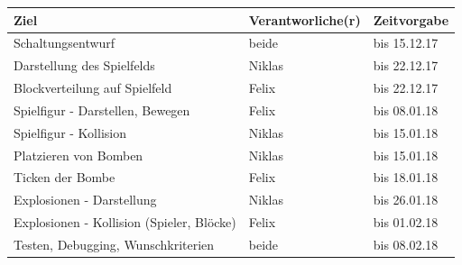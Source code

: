 \documentclass[parskip=full]{scrartcl}
\begin{document}
		\begin{table}[H]
			\centering
			\label{my-label}
			\begin{tabular}{l|l|l}
				Ziel                                      & Verantworliche(r) & Zeitvorgabe  \\
				\hline
				Schaltungsentwurf                         & beide           & bis 15.12.17 \\
				Darstellung des Spielfelds                & Niklas          & bis 22.12.17 \\
				Blockverteilung auf Spielfeld             & Felix           & bis 22.12.17 \\
				Spielfigur - Darstellen, Bewegen          & Felix           & bis 08.01.18 \\
				Spielfigur - Kollision                    & Niklas          & bis 15.01.18 \\
				Platzieren von Bomben                     & Niklas          & bis 15.01.18 \\
				Ticken der Bombe                          & Felix           & bis 18.01.18 \\
				Explosionen - Darstellung                 & Niklas          & bis 26.01.18 \\
				Explosionen - Kollision (Spieler, Blöcke) & Felix           & bis 01.02.18 \\
				Testen, Debugging, Wunschkriterien        & beide           & bis 08.02.18
			\end{tabular}
		\end{table}

				
\end{document}
